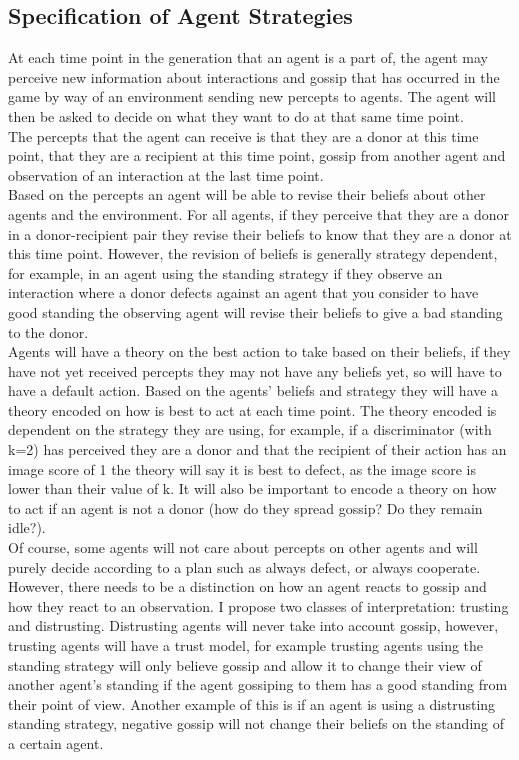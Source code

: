 \documentclass[twoside,twocolumn]{article}
\begin{document}
\subsection{Specification of Agent Strategies}
At each time point in the generation that an agent is a part of, the agent may perceive new information about interactions and gossip that has occurred in the game by way of an environment sending new percepts to agents. The agent will then be asked to decide on what they want to do at that same time point.\\
The percepts that the agent can receive is that they are a donor at this time point, that they are a recipient at this time point, gossip from another agent and observation of an interaction at the last time point.\\
Based on the percepts an agent will be able to revise their beliefs about other agents and the environment. For all agents, if they perceive that they are a donor in a donor-recipient pair they revise their beliefs to know that they are a donor at this time point. However, the revision of beliefs is generally strategy dependent, for example, in an agent using the standing strategy if they observe an interaction where a donor defects against an agent that you consider to have good standing the observing agent will revise their beliefs to give a bad standing to the donor.\\
Agents will have a theory on the best action to take based on their beliefs, if they have not yet received percepts they may not have any beliefs yet, so will have to have a default action. Based on the agents' beliefs and strategy they will have a theory encoded on how is best to act at each time point. The theory encoded is dependent on the strategy they are using, for example, if a discriminator (with k=2) has perceived they are a donor and that the recipient of their action has an image score of 1 the theory will say it is best to defect, as the image score is lower than their value of k. It will also be important to encode a theory on how to act if an agent is not a donor (how do they spread gossip? Do they remain idle?).\\
Of course, some agents will not care about percepts on other agents and will purely decide according to a plan such as always defect, or always cooperate. However, there needs to be a distinction on how an agent reacts to gossip and how they react to an observation. I propose two classes of interpretation: trusting and distrusting. Distrusting agents will never take into account gossip, however, trusting agents will have a trust model, for example trusting agents using the standing strategy will only believe gossip and allow it to change their view of another agent's standing if the agent gossiping to them has a good standing from their point of view. Another example of this is if an agent is using a distrusting standing strategy, negative gossip will not change their beliefs on the standing of a certain agent.\\
\end{document}
